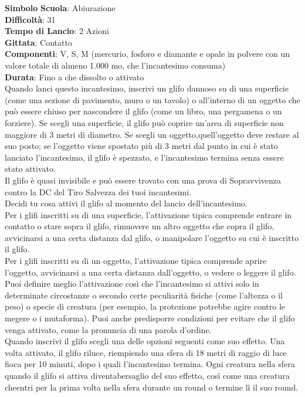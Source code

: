 \begin{multicols}{2}
\medskip\textbf{Simbolo}
\textbf{Scuola}: Abiurazione\\
\textbf{Difficoltà}: 31\\
\textbf{Tempo di Lancio}: 2 Azioni\\
\textbf{Gittata}: Contatto\\
\textbf{Componenti}: V, S, M (mercurio, fosforo e diamante e opale in polvere con un valore totale di almeno 1.000 mo, che l'incantesimo consuma)\\
\textbf{Durata}: Fino a che dissolto o attivato\\
Quando lanci questo incantesimo, inscrivi un glifo dannoso su di una superficie (come una sezione di pavimento, muro o un tavolo) o all'interno di un oggetto che può essere chiuso per nascondere il glifo (come un libro, una pergamena o un forziere). Se scegli una superficie, il glifo può coprire un'area di superficie non maggiore di 3 metri di diametro. Se scegli un oggetto,quell'oggetto deve restare al suo posto; se l'oggetto viene spostato più di 3 metri dal punto in cui è stato lanciato l'incantesimo, il glifo è spezzato, e l'incantesimo termina senza essere stato attivato.\\
Il glifo è quasi invisibile e può essere trovato con una prova di Sopravvivenza contro la DC del Tiro Salvezza dei tuoi incantesimi.\\
Decidi tu cosa attivi il glifo al momento del lancio dell'incantesimo.\\
Per i glifi inscritti su di una superficie, l'attivazione tipica comprende entrare in contatto o stare sopra il glifo, rimuovere un altro oggetto che copra il glifo, avvicinarsi a una certa distanza dal glifo, o manipolare l'oggetto su cui è inscritto il glifo.\\
Per i glifi inscritti su di un oggetto, l'attivazione tipica comprende aprire l'oggetto, avvicinarsi a una certa distanza dall'oggetto, o vedere o leggere il glifo.\\
Puoi definire meglio l'attivazione così che l'incantesimo si attivi solo in determinate circostanze o secondo certe peculiarità fisiche (come l'altezza o il peso) o specie di creatura (per esempio, la protezione potrebbe agire contro le megere o i mutaforma). Puoi anche predisporre condizioni per evitare che il glifo venga attivato, come la pronuncia di una parola d'ordine.\\
Quando inscrivi il glifo scegli una delle opzioni seguenti come suo effetto. Una volta attivato, il glifo riluce, riempiendo una sfera di 18 metri di raggio di luce fioca per 10 minuti, dopo i quali l'incantesimo termina. Ogni creatura nella sfera quando il glifo si attiva diventabersaglio del suo effetto, così come una creatura cheentri per la prima volta nella sfera durante un round o termine lì il suo round.\\

\end{multicols}
